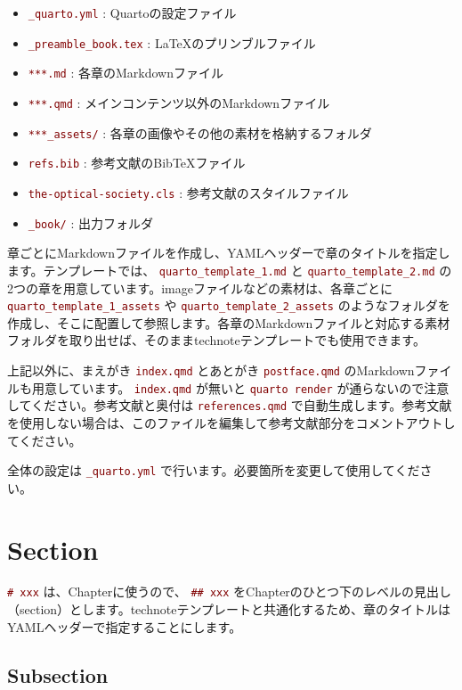 \documentclass[
  japanese,
  letterpaper,
  lualatex,
  ja=standard,
  10pt,
  a4paper,
  textwidth-limit=50,
  openany]{bxjsbook}
\providecommand{\tightlist}{%
  \setlength{\itemsep}{0pt}\setlength{\parskip}{0pt}}
\let\oldtexttt\texttt
\renewcommand{\texttt}[1]{  %
  \colorbox{codebg}{  %
    \textcolor{Maroon}{  %
      \small  %
      \oldtexttt{#1}
    }
  }
}
\begin{document}
\begin{itemize}
\tightlist
\item
  \texttt{\_quarto.yml}: Quartoの設定ファイル
\item
  \texttt{\_preamble\_book.tex}: LaTeXのプリンブルファイル
\item
  \texttt{***.md}: 各章のMarkdownファイル
\item
  \texttt{***.qmd}: メインコンテンツ以外のMarkdownファイル
\item
  \texttt{***\_assets/}: 各章の画像やその他の素材を格納するフォルダ
\item
  \texttt{refs.bib}: 参考文献のBibTeXファイル
\item
  \texttt{the-optical-society.cls}: 参考文献のスタイルファイル
\item
  \texttt{\_book/}: 出力フォルダ
\end{itemize}

章ごとにMarkdownファイルを作成し、YAMLヘッダーで章のタイトルを指定します。テンプレートでは、\texttt{quarto\_template\_1.md}と\texttt{quarto\_template\_2.md}の2つの章を用意しています。imageファイルなどの素材は、各章ごとに\texttt{quarto\_template\_1\_assets}や\texttt{quarto\_template\_2\_assets}のようなフォルダを作成し、そこに配置して参照します。各章のMarkdownファイルと対応する素材フォルダを取り出せば、そのままtechnoteテンプレートでも使用できます。

上記以外に、まえがき\texttt{index.qmd}とあとがき\texttt{postface.qmd}のMarkdownファイルも用意しています。\texttt{index.qmd}が無いと\texttt{quarto\ render}が通らないので注意してください。参考文献と奥付は\texttt{references.qmd}で自動生成します。参考文献を使用しない場合は、このファイルを編集して参考文献部分をコメントアウトしてください。

全体の設定は\texttt{\_quarto.yml}で行います。必要箇所を変更して使用してください。

\section{Section}\label{section-1}

\texttt{\#\ xxx}は、Chapterに使うので、\texttt{\#\#\ xxx}をChapterのひとつ下のレベルの見出し（section）とします。technoteテンプレートと共通化するため、章のタイトルはYAMLヘッダーで指定することにします。

\subsection{Subsection}\label{subsection-1}
\end{document}
